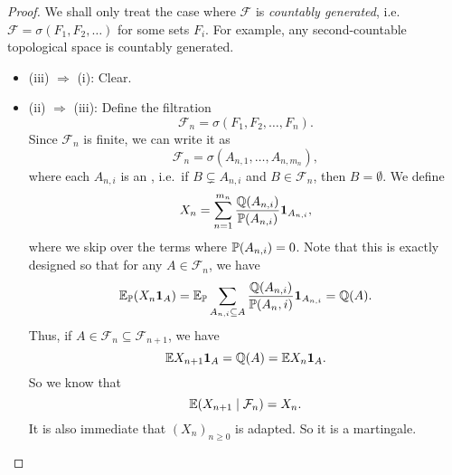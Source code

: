 \documentclass[a4paper]{article}
\begin{document}
\begin{proof}
  We shall only treat the case where $\mathcal{F}$ is \emph{countably generated}, i.e.\ $\mathcal{F} = \sigma(F_1, F_2, \ldots)$ for some sets $F_i$. For example, any second-countable topological space is countably generated.
  \begin{itemize}
    \item (iii) $\Rightarrow$ (i): Clear.
    \item (ii) $\Rightarrow$ (iii): Define the filtration
      \[
        \mathcal{F}_n = \sigma(F_1, F_2, \ldots, F_n).
      \]
      Since $\mathcal{F}_n$ is finite, we can write it as
      \[
        \mathcal{F}_n = \sigma(A_{n, 1}, \ldots, A_{n, m_n}),
      \]
      where each $A_{n, i}$ is an , i.e.\ if $B \subsetneq A_{n, i}$ and $B \in \mathcal{F}_n$, then $B = \emptyset$. We define
      \[
        X_n = \sum_{n = 1}^{m_n} \frac{\Q(A_{n, i})}{\P(A_{n, i})} \mathbf{1}_{A_{n, i}},
      \]
      where we skip over the terms where $\P(A_{n, i}) = 0$. Note that this is exactly designed so that for any $A \in \mathcal{F}_n$, we have
      \[
        \E_\P (X_n \mathbf{1}_A) = \E_\P \sum_{A_{n, i} \subseteq A} \frac{\Q(A_{n, i})}{\P(A_n, i)} \mathbf{1}_{A_{n, i}} = \Q(A).
      \]
      Thus, if $A \in \mathcal{F}_n \subseteq \mathcal{F}_{n + 1}$, we have
      \[
        \E X_{n + 1} \mathbf{1}_A = \Q(A) = \E X_n \mathbf{1}_A.
      \]
      So we know that
      \[
        \E(X_{n + 1} \mid \mathcal{F}_n) = X_n.
      \]
      It is also immediate that $(X_n)_{n \geq 0}$ is adapted. So it is a martingale.


\end{itemize}
\end{proof}
\end{document}
